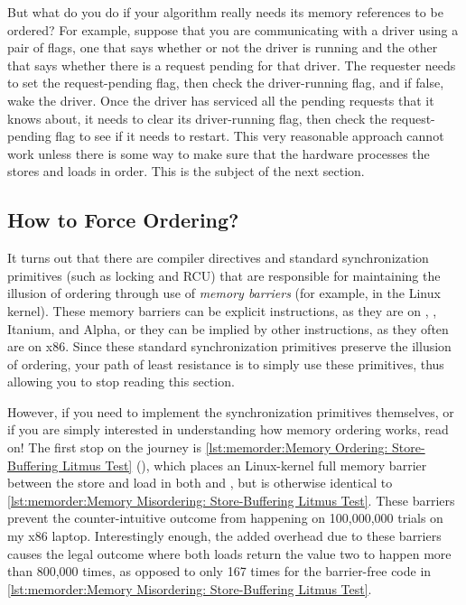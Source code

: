 But what do you do if your algorithm really needs its memory
references to be ordered?
For example, suppose that you are communicating with a driver using
a pair of flags, one that says whether or not the driver is running
and the other that says whether there is a request pending for that
driver.
The requester needs to set the request-pending flag, then check
the driver-running flag, and if false, wake the driver.
Once the driver has serviced all the pending requests that it knows about,
it needs to clear its driver-running flag, then check the request-pending
flag to see if it needs to restart.
This very reasonable approach cannot work unless there is some way
to make sure that the hardware processes the stores and loads in order.
This is the subject of the next section.

\subsection{How to Force Ordering?}
\label{sec:memorder:How to Force Ordering?}

It turns out that there are compiler directives and standard
synchronization primitives (such as locking and RCU)
that are responsible for maintaining the illusion of ordering through use of
\emph{memory barriers} (for example,  in the Linux kernel).
These memory barriers can be explicit instructions, as they are on
\ARM, \Power{}, Itanium, and Alpha, or they can be implied by other instructions,
as they often are on x86.
Since these standard synchronization primitives preserve the illusion of
ordering, your path of least resistance is to simply use these primitives,
thus allowing you to stop reading this section.

\begin{listing}[tbp]

\caption{Memory Ordering: Store-Buffering Litmus Test}
\label{lst:memorder:Memory Ordering: Store-Buffering Litmus Test}
\end{listing}

However, if you need to implement the synchronization primitives
themselves, or if you are simply interested in understanding how memory
ordering works, read on!
The first stop on the journey is
\cref{lst:memorder:Memory Ordering: Store-Buffering Litmus Test}
(),
which places an  Linux-kernel full memory barrier between
the store and load in both  and , but is otherwise
identical to
\cref{lst:memorder:Memory Misordering: Store-Buffering Litmus Test}.
These barriers prevent the counter-intuitive outcome from happening
on 100,000,000 trials on my x86 laptop.
Interestingly enough, the added overhead due to these barriers causes the
legal outcome where both loads return the value two to happen more
than 800,000 times, as opposed to only 167 times for the
barrier-free code in
\cref{lst:memorder:Memory Misordering: Store-Buffering Litmus Test}.

